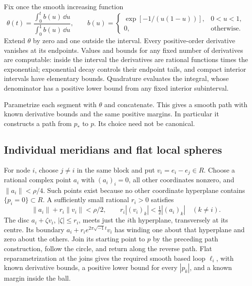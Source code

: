 Fix once the smooth increasing function
\begin{equation}\label{eq:flat-time-change}
 \theta(t)=\frac{\int_0^t b(u)\,\dd u}{\int_0^1 b(u)\,\dd u},
 \qquad
 b(u)=
 \begin{cases}
  \exp[-1/(u(1-u))],&0<u<1,\\
  0,&\text{otherwise}.
 \end{cases}
\end{equation}
Extend $\theta$ by zero and one outside the interval. Every
positive-order derivative vanishes at its endpoints. Values and
bounds for any fixed number of derivatives are computable:
inside the interval the derivatives are rational functions times
the exponential; exponential decay controls their endpoint tails,
and compact interior intervals have elementary bounds. Quadrature
evaluates the integral, whose denominator has a positive lower
bound from any fixed interior subinterval.

Parametrize each segment with $\theta$ and concatenate. This
gives a smooth path with known derivative bounds and the same
positive margins. In particular it constructs a path from $p_*$
to $p$. Its choice need not be canonical.

\subsection{Individual meridians and flat local spheres}

For node $i$, choose $j\ne i$ in the same block and put
$v_i=e_i-e_j\in R$. Choose a rational complex point $a_i$ with
$(a_i)_i=0$, all other coordinates nonzero, and $\|a_i\|<\rho/4$.
Such points exist because no other coordinate hyperplane contains
$\{p_i=0\}\subset R$. A sufficiently small rational $r_i>0$
satisfies
\begin{equation}\label{eq:meridian-disc-bounds}
 \|a_i\|+r_i\|v_i\|<\rho/2,\qquad
 r_i|(v_i)_k|<\tfrac12|(a_i)_k|\quad(k\ne i).
\end{equation}
The disc $a_i+\zeta v_i$, $|\zeta|\le r_i$, meets just the
$i$th hyperplane, transversely at its centre. Its boundary
$a_i+r_i e^{2\pi\sqrt{-1}t}v_i$ has winding one about that
hyperplane and zero about the others. Join its starting point to
$p$ by the preceding path construction, follow the circle, and
return along the reverse path. Flat reparametrization at the joins
gives the required smooth based loop $\ell_i$, with known
derivative bounds, a positive lower bound for every $|p_k|$,
and a known margin inside the ball.

